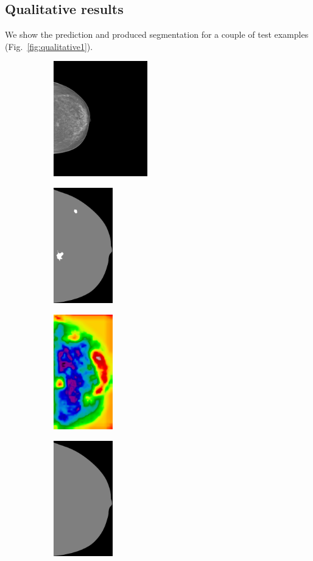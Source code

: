 \subsection{Qualitative results}
We show the prediction and produced segmentation for a couple of test examples (Fig.~\ref{fig:qualitative1}).
\begin{figure}[h]
\centering
	\begin{subfigure}{0.25\textwidth}
		\centering
			\includegraphics[height = 5cm]{plots/mammogram_ex1.png}
	\end{subfigure}
	\begin{subfigure}{0.2\textwidth}
		\centering
			\includegraphics[height = 5cm]{plots/label_ex1.png}
	\end{subfigure}
	\begin{subfigure}{0.16\textwidth}
		\centering
			\includegraphics[height = 5cm]{plots/logits_ex1_v1.png}
	\end{subfigure}
	\begin{subfigure}{0.2\textwidth}
		\centering
			\includegraphics[height = 5cm]{plots/segmentation_ex1_v1.png}

\end{subfigure}
\end{figure}
